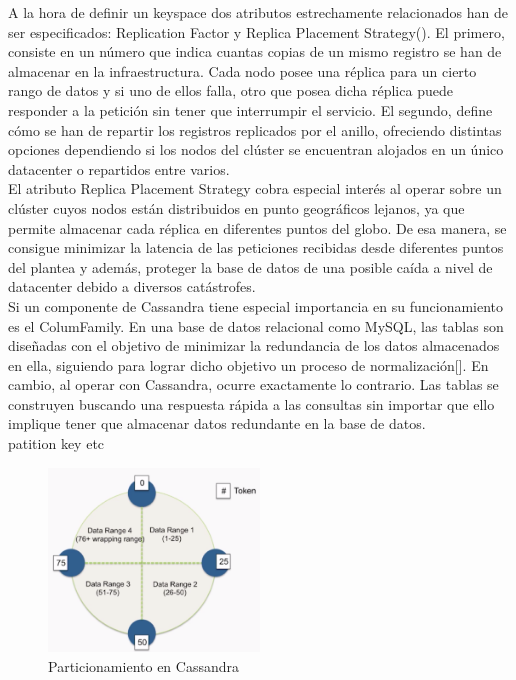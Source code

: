 A la hora de definir un keyspace dos atributos estrechamente relacionados han de ser especificados: Replication Factor y Replica Placement Strategy(). El primero, consiste en un número que indica cuantas copias de un mismo registro se han de almacenar en la infraestructura. Cada nodo posee una réplica para un cierto rango de datos y si uno de ellos falla, otro que posea dicha réplica puede responder a la petición sin tener que interrumpir el servicio. El segundo, define cómo se han de repartir los registros replicados por el anillo, ofreciendo distintas opciones dependiendo si los nodos del clúster se encuentran alojados en un único datacenter o repartidos entre varios.\\

El atributo Replica Placement Strategy cobra especial interés al operar sobre un clúster cuyos nodos están distribuidos en punto geográficos lejanos, ya que permite almacenar cada réplica en diferentes puntos del globo. De esa manera, se consigue minimizar la latencia de las peticiones recibidas desde diferentes puntos del plantea y además, proteger la base de datos de una posible caída a nivel de datacenter debido a diversos catástrofes.\\ 

Si un componente de Cassandra tiene especial importancia en su funcionamiento es el ColumFamily. En una base de datos relacional como MySQL, las tablas son diseñadas con el objetivo de minimizar la redundancia de los datos almacenados en ella, siguiendo para lograr dicho objetivo un proceso de normalización[]. En cambio, al operar con Cassandra, ocurre exactamente lo contrario. Las tablas se construyen buscando una respuesta rápida a las consultas sin importar que ello implique tener que almacenar datos redundante en la base de datos.\\

patition key etc



\begin{figure}[h]
	\centering
	\includegraphics[width=0.5\textwidth]{Ilustraciones/cassandra_token.png}
	\caption{Particionamiento en Cassandra}
	\label{fig:cassandra_token}
\end{figure}

